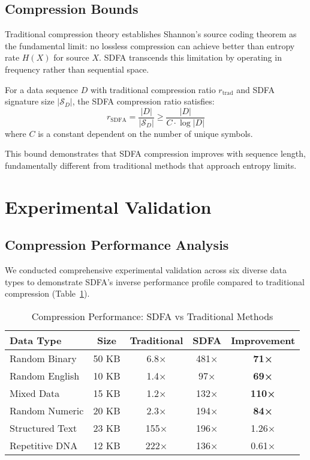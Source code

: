 \documentclass[10pt,journal,compsoc]{IEEEtran}
\newcommand{\sdfa}{\textsc{SDFA}}
\newcommand{\sig}[1]{\mathcal{S}_{#1}}
\begin{document}
\subsection{Compression Bounds}

Traditional compression theory establishes Shannon's source coding theorem as the fundamental limit: no lossless compression can achieve better than entropy rate $H(X)$ for source $X$. \sdfa{} transcends this limitation by operating in frequency rather than sequential space.

\begin{theorem}
For a data sequence $D$ with traditional compression ratio $r_{\text{trad}}$ and \sdfa{} signature size $|\sig{D}|$, the \sdfa{} compression ratio satisfies:
\begin{equation}
r_{\text{SDFA}} = \frac{|D|}{|\sig{D}|} \geq \frac{|D|}{C \cdot \log|D|}
\end{equation}
where $C$ is a constant dependent on the number of unique symbols.
\end{theorem}

This bound demonstrates that \sdfa{} compression improves with sequence length, fundamentally different from traditional methods that approach entropy limits.

\section{Experimental Validation}

\subsection{Compression Performance Analysis}

We conducted comprehensive experimental validation across six diverse data types to demonstrate \sdfa's inverse performance profile compared to traditional compression (Table~\ref{tab:compression_results}).

\begin{table}[t]
\centering
\caption{Compression Performance: \sdfa{} vs Traditional Methods}
\label{tab:compression_results}
\begin{tabular}{lcccc}
\toprule
\textbf{Data Type} & \textbf{Size} & \textbf{Traditional} & \textbf{\sdfa{}} & \textbf{Improvement} \\
\midrule
Random Binary & 50 KB & 6.8× & 481× & \textbf{71×} \\
Random English & 10 KB & 1.4× & 97× & \textbf{69×} \\
Mixed Data & 15 KB & 1.2× & 132× & \textbf{110×} \\
Random Numeric & 20 KB & 2.3× & 194× & \textbf{84×} \\
\midrule
Structured Text & 23 KB & 155× & 196× & 1.26× \\
Repetitive DNA & 12 KB & 222× & 136× & 0.61× \\
\bottomrule
\end{tabular}
\end{table}
\end{document}
